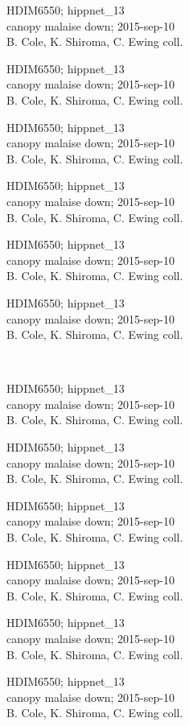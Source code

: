 \documentclass[2pt]{extarticle}
\begin{document}
\noindent
\parbox{0.16\textwidth}{\tiny \raggedright \rule[-0.3\baselineskip]{0pt}{10pt}HDIM6550; hippnet\_13\\ canopy malaise down; 2015-sep-10\\ B. Cole, K. Shiroma, C. Ewing coll.}
\parbox{0.16\textwidth}{\tiny \raggedright \rule[-0.3\baselineskip]{0pt}{10pt}HDIM6550; hippnet\_13\\ canopy malaise down; 2015-sep-10\\ B. Cole, K. Shiroma, C. Ewing coll.}
\parbox{0.16\textwidth}{\tiny \raggedright \rule[-0.3\baselineskip]{0pt}{10pt}HDIM6550; hippnet\_13\\ canopy malaise down; 2015-sep-10\\ B. Cole, K. Shiroma, C. Ewing coll.}
\parbox{0.16\textwidth}{\tiny \raggedright \rule[-0.3\baselineskip]{0pt}{10pt}HDIM6550; hippnet\_13\\ canopy malaise down; 2015-sep-10\\ B. Cole, K. Shiroma, C. Ewing coll.}
\parbox{0.16\textwidth}{\tiny \raggedright \rule[-0.3\baselineskip]{0pt}{10pt}HDIM6550; hippnet\_13\\ canopy malaise down; 2015-sep-10\\ B. Cole, K. Shiroma, C. Ewing coll.}
\parbox{0.16\textwidth}{\tiny \raggedright \rule[-0.3\baselineskip]{0pt}{10pt}HDIM6550; hippnet\_13\\ canopy malaise down; 2015-sep-10\\ B. Cole, K. Shiroma, C. Ewing coll.} \\ 
\vspace{0.001in} 

\noindent
\parbox{0.16\textwidth}{\tiny \raggedright \rule[-0.3\baselineskip]{0pt}{10pt}HDIM6550; hippnet\_13\\ canopy malaise down; 2015-sep-10\\ B. Cole, K. Shiroma, C. Ewing coll.}
\parbox{0.16\textwidth}{\tiny \raggedright \rule[-0.3\baselineskip]{0pt}{10pt}HDIM6550; hippnet\_13\\ canopy malaise down; 2015-sep-10\\ B. Cole, K. Shiroma, C. Ewing coll.}
\parbox{0.16\textwidth}{\tiny \raggedright \rule[-0.3\baselineskip]{0pt}{10pt}HDIM6550; hippnet\_13\\ canopy malaise down; 2015-sep-10\\ B. Cole, K. Shiroma, C. Ewing coll.}
\parbox{0.16\textwidth}{\tiny \raggedright \rule[-0.3\baselineskip]{0pt}{10pt}HDIM6550; hippnet\_13\\ canopy malaise down; 2015-sep-10\\ B. Cole, K. Shiroma, C. Ewing coll.}
\parbox{0.16\textwidth}{\tiny \raggedright \rule[-0.3\baselineskip]{0pt}{10pt}HDIM6550; hippnet\_13\\ canopy malaise down; 2015-sep-10\\ B. Cole, K. Shiroma, C. Ewing coll.}
\parbox{0.16\textwidth}{\tiny \raggedright \rule[-0.3\baselineskip]{0pt}{10pt}HDIM6550; hippnet\_13\\ canopy malaise down; 2015-sep-10\\ B. Cole, K. Shiroma, C. Ewing coll.} \\ 
\vspace{0.001in} 
\end{document}
